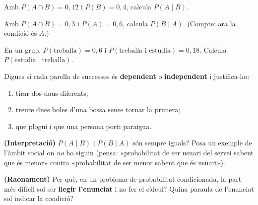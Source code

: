 \begin{exercicis}
\begin{exlist}
  \item Amb $P(A\cap B)=0,12$ i $P(B)=0,4$, calcula $P(A\mid B)$.
  \item Amb $P(A\cap B)=0,3$ i $P(A)=0,6$, calcula $P(B\mid A)$. (Compte: ara la
        condició és $A$.)
  \item En un grup, $P(\text{treballa})=0,6$ i $P(\text{treballa i estudia})=0,18$.
        Calcula $P(\text{estudia}\mid\text{treballa})$.
  \item Digues si cada parella de successos és \textbf{dependent} o \textbf{independent}
        i justifica-ho:
    \begin{enumerate}[label=\alph*), leftmargin=1.6em, topsep=2pt]
      \item tirar dos daus diferents;
      \item treure dues boles d'una bossa sense tornar la primera;
      \item que plogui i que una persona porti paraigua.
    \end{enumerate}
  \item \textbf{(Interpretació)} $P(A\mid B)$ i $P(B\mid A)$ són sempre iguals? Posa un
        exemple de l'àmbit social on \emph{no} ho siguin (pensa: «probabilitat de ser
        usuari del servei sabent que és menor» contra «probabilitat de ser menor sabent
        que és usuari»).
  \item \textbf{(Raonament)} Per què, en un problema de probabilitat condicionada, la
        part més difícil sol ser \textbf{llegir l'enunciat} i no fer el càlcul? Quina
        paraula de l'enunciat sol indicar la condició?
\end{exlist}
\end{exercicis}

